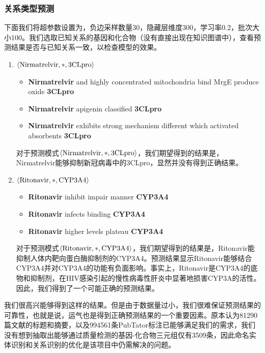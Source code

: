 \documentclass[twocolumn]{article}
\begin{document}
\subsubsection{关系类型预测}
下面我们将超参数设置为，负边采样数量30，隐藏层维度300，学习率0.2，批次大小100。我们选取已知关系的基因和化合物（没有直接出现在知识图谱中），查看预测结果是否与已知关系一致，以检查模型的效果。\par
\begin{enumerate}
	\item $\langle \textnormal{Nirmatrelvir}, *, \textnormal{3CLpro}\rangle$\par
	\begin{itemize}
		\item \textbf{Nirmatrelvir} and highly concentrated mitochondria bind MrgE produce oxide \textbf{3CLpro}
		\item \textbf{Nirmatrelvir} apigenin classified \textbf{3CLpro}
		\item \textbf{Nirmatrelvir} exhibits strong mechanism different which activated absorbents \textbf{3CLpro}
	\end{itemize}\par
	对于预测模式$\langle \textnormal{Nirmatrelvir}, *, \textnormal{3CLpro}\rangle$，我们期望得到的结果是，Nirmatrelvir能够抑制新冠病毒中的3CLpro，显然并没有得到正确结果。
	\item $\langle \textnormal{Ritonavir}, *, \textnormal{CYP3A4}\rangle$\par
	\begin{itemize}
		\item \textbf{Ritonavir} inhibit impair manner \textbf{CYP3A4}
		\item \textbf{Ritonavir} infects binding \textbf{CYP3A4}
		\item \textbf{Ritonavir} higher levels plateau \textbf{CYP3A4}
	\end{itemize}
	对于预测模式$\langle \textnormal{Ritonavir}, *, \textnormal{CYP3A4}\rangle$，我们期望得到的结果是，Ritonavir能抑制人体内靶向蛋白酶抑制剂的CYP3A4。预测结果显示Ritonavir能够结合CYP3A4并对CYP3A4的功能有负面影响。事实上，Ritonavir是CYP3A4的底物和抑制剂，在HIV感染引起的慢性病毒性肝炎中显著地损害CYP3A的活性\cite{ritonavir1, ritonavir2}。因此，我们得到了一个可能正确的预测结果。
\end{enumerate}\par
我们很高兴能够得到这样的结果。但是由于数据量过小，我们很难保证预测结果的可靠性，也就是说，运气也是得到正确预测结果的一个重要因素。原本认为81290篇文献的标题和摘要，以及994561条PubTator标注已能够满足我们的需求，我们没有想到抽取出能够通过质量检测的基因-化合物三元组仅有3509条，因此命名实体识别和关系识别的优化是该项目中仍需解决的问题。
\end{document}
